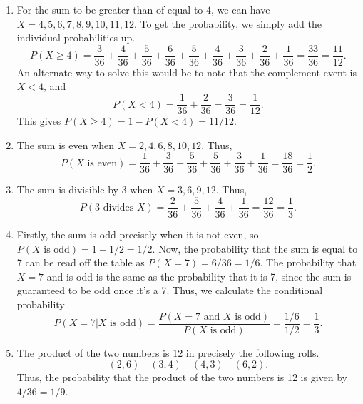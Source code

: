 \documentclass[10pt]{article}
\begin{document}
        \begin{enumerate}
                \item For the sum to be greater than of equal to $4$, we can have $X = 4, 5, 6, 7, 8, 9, 10, 11, 12$.
                To get the probability, we simply add the individual probabilities up.
                \[
                        P(X \geq 4) = \frac{3}{36} + \frac{4}{36} + \frac{5}{36} + \frac{6}{36} + \frac{5}{36} + \frac{4}{36} + \frac{3}{36}
                        + \frac{2}{36} + \frac{1}{36} = \frac{33}{36} = \frac{11}{12}.
                \]
                An alternate way to solve this would be to note that the complement event is $X < 4$, and
                \[
                        P(X < 4) = \frac{1}{36} + \frac{2}{36} = \frac{3}{36} = \frac{1}{12}.
                \]
                This gives $P(X \geq 4) = 1 - P(X < 4) = 11 /12$.

                \item The sum is even when $X = 2, 4, 6, 8, 10, 12$. Thus,
                \[
                        P(X \text{ is even}) = \frac{1}{36} + \frac{3}{36} + \frac{5}{36} + \frac{5}{36} + \frac{3}{36} + \frac{1}{36} 
                                = \frac{18}{36} = \frac{1}{2}.
                \]

                \item The sum is divisible by 3 when $X = 3, 6, 9, 12$. Thus,
                \[
                        P(3\text{ divides }X) = \frac{2}{36} + \frac{5}{36} + \frac{4}{36} + \frac{1}{36} = \frac{12}{36} = \frac{1}{3}.
                \]
                \item Firstly, the sum is odd precisely when it is not even, so $P(X\text{ is odd}) = 1 - 1 /2 = 1 /2$.
                Now, the probability that the sum is equal to 7 can be read off the table as $P(X = 7) = 6 /36 = 1 /6$.
                The probability that $X = 7$ and is odd is the same as the probability that it is 7, since the sum is guaranteed to be
                odd once it's a 7.
                Thus, we calculate the conditional probability
                \[
                        P(X = 7 | X\text{ is odd}) = \frac{P(X = 7 \text{ and } X \text{ is odd})}{P(X\text{ is odd})} = \frac{1 /6}{1 /2} = \frac{1}{3}.
                \]

                \item The product of the two numbers is 12 in precisely the following rolls.
                \[
                        (2, 6) \quad (3, 4)\quad (4, 3) \quad (6, 2).
                \]
                Thus, the probability that the product of the two numbers is 12 is given by $4 /36  = 1 /9$.
        \end{enumerate}
\end{document}
